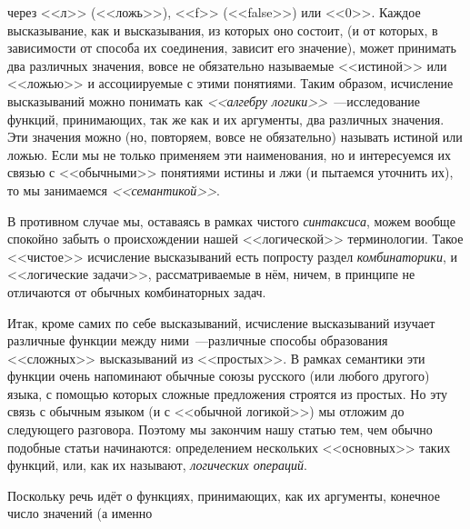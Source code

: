 \thispagestyle{empty} %
\begin{minipage}{.43\textwidth}
    \normalsize
    через <<л>> (<<ложь>>), <<f>> (<<false>>) или <<0>>. Каждое высказывание, как и высказывания, из которых оно состоит, (и от которых, в зависимости от способа их соединения, зависит его значение), может принимать два различных значения, вовсе не обязательно называемые <<истиной>> или <<ложью>> и ассоциируемые с этими понятиями. Таким образом, исчисление высказываний можно понимать как \emph{<<алгебру логики>>}~---исследование функций, принимающих, так же как и их аргументы, два различных значения. Эти значения можно (но, повторяем, вовсе не обязательно) называть истиной или ложью. Если мы не только применяем эти наименования, но и интересуемся их связью с <<обычными>> понятиями истины и лжи (и пытаемся уточнить их), то мы занимаемся \emph{<<семантикой>>}.

    \hspace{0.5cm}В противном случае мы, оставаясь в рамках чистого \emph{синтаксиса}, можем вообще спокойно забыть о происхождении нашей <<логической>> терминологии. Такое <<чистое>> исчисление высказываний есть попросту раздел \emph{комбинаторики}, и <<логические задачи>>, рассматриваемые в нём, ничем, в принципе не отличаются от обычных комбинаторных задач.

    \hspace{0.5cm}Итак, кроме самих по себе высказываний, исчисление высказываний изучает различные функции между ними~---различные способы образования <<сложных>> высказываний из <<простых>>. В рамках семантики эти функции очень напоминают обычные союзы русского (или любого другого) языка, с помощью которых сложные предложения строятся из простых. Но эту связь с обычным языком (и с <<обычной логикой>>) мы отложим до следующего разговора. Поэтому мы закончим нашу статью тем, чем обычно подобные статьи начинаются: определением нескольких <<основных>> таких функций, или, как их называют, \emph{логических операций}.

    \hspace{0.5cm}Поскольку речь идёт о функциях, принимающих, как их аргументы, конечное число значений (а именно
\end{minipage}
\hspace{0.5cm}
